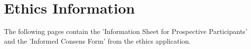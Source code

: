 \chapter{Ethics Information}

The following pages contain the 'Information Sheet for Prospective Participants' and the 'Informed Consens Form' from the ethics application.

